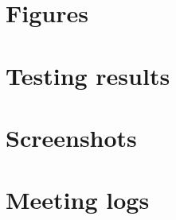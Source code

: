 \documentclass[twoside]{report}
\begin{document}
\printbibliography[heading=bibintoc, title={Bibliography}]

\appendix
% 
\chapter{Figures}


\chapter{Testing results}

\chapter{Screenshots}

\chapter{Meeting logs}



\end{document}

